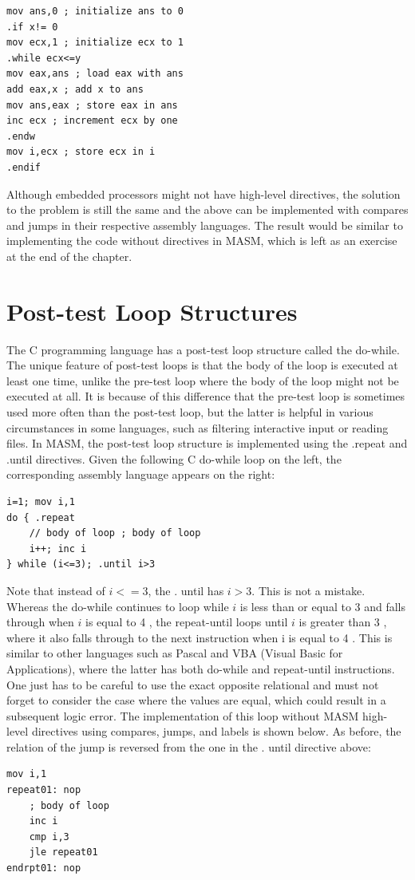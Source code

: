 \documentclass[10pt]{book}
\begin{document}
\begin{verbatim}
mov ans,0 ; initialize ans to 0
.if x!= 0
mov ecx,1 ; initialize ecx to 1
.while ecx<=y
mov eax,ans ; load eax with ans
add eax,x ; add x to ans
mov ans,eax ; store eax in ans
inc ecx ; increment ecx by one
.endw
mov i,ecx ; store ecx in i
.endif
\end{verbatim}

Although embedded processors might not have high-level directives, the solution to the problem is still the same and the above can be implemented with compares and jumps in their respective assembly languages. The result would be similar to implementing the code without directives in MASM, which is left as an exercise at the end of the chapter.

\section{Post-test Loop Structures}
The C programming language has a post-test loop structure called the do-while. The unique feature of post-test loops is that the body of the loop is executed at least one time, unlike the pre-test loop where the body of the loop might not be executed at all. It is because of this difference that the pre-test loop is sometimes used more often than the post-test loop, but the latter is helpful in various circumstances in some languages, such as filtering interactive input or reading files. In MASM, the post-test loop structure is implemented using the .repeat and .until directives. Given the following C do-while loop on the left, the corresponding assembly language appears on the right:

\begin{verbatim}
i=1; mov i,1
do { .repeat
    // body of loop ; body of loop
    i++; inc i
} while (i<=3); .until i>3
\end{verbatim}

Note that instead of $i<=3$, the . until has $i>3$. This is not a mistake. Whereas the do-while continues to loop while $i$ is less than or equal to 3 and falls through when $i$ is equal to 4 , the repeat-until loops until $i$ is greater than 3 , where it also falls through to the next instruction when i is equal to 4 . This is similar to other languages such as Pascal and VBA (Visual Basic for Applications), where the latter has both do-while and repeat-until instructions. One just has to be careful to use the exact opposite relational and must not forget to consider the case where the values are equal, which could result in a subsequent logic error. The implementation of this loop without MASM high-level directives using compares, jumps, and labels is shown below. As before, the relation of the jump is reversed from the one in the . until directive above:
\begin{verbatim}
mov i,1
repeat01: nop
    ; body of loop
    inc i
    cmp i,3
    jle repeat01
endrpt01: nop
\end{verbatim}
\end{document}
